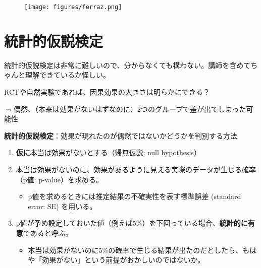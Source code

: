 \documentclass[
  xelatex,
  ja=standard]{bxjsarticle}
\providecommand{\tightlist}{%
  \setlength{\itemsep}{0pt}\setlength{\parskip}{0pt}}\usepackage{longtable,booktabs,array}
\begin{document}
\begin{figure}[htpb]

{\centering \texttt{[image: figures/ferraz.png]}

}

\caption{\citet{ferraz2008}}

\end{figure}

\hypertarget{ux7d71ux8a08ux7684ux4eeeux8aacux691cux5b9a}{%
\section{統計的仮説検定}\label{ux7d71ux8a08ux7684ux4eeeux8aacux691cux5b9a}}

\begin{tcolorbox}[enhanced jigsaw, left=2mm, coltitle=black, arc=.35mm, toprule=.15mm, colbacktitle=quarto-callout-warning-color!10!white, breakable, colframe=quarto-callout-warning-color-frame, opacityback=0, leftrule=.75mm, bottomrule=.15mm, colback=white, toptitle=1mm, opacitybacktitle=0.6, bottomtitle=1mm, rightrule=.15mm, titlerule=0mm, title=\textcolor{quarto-callout-warning-color}{\faExclamationTriangle}\hspace{0.5em}{警告}]

統計的仮説検定は非常に難しいので、分からなくても構わない。講師を含めてちゃんと理解できているか怪しい。

\end{tcolorbox}

RCTや自然実験であれば、因果効果の大きさは明らかにできる？

\(\leadsto\)偶然、（本来は効果がないはずなのに）2つのグループで差が出てしまった可能性

\textbf{統計的仮説検定}：効果が現れたのが偶然ではないかどうかを判別する方法

\begin{enumerate}
\def\labelenumi{\arabic{enumi}.}
\tightlist
\item
  \textbf{仮に}本当は効果がないとする（帰無仮説: null hypothesis）
\item
  本当は効果がないのに、効果があるように見える実際のデータが生じる確率（p値:
  p-value）を求める。

  \begin{itemize}
  \tightlist
  \item
    p値を求めるときには推定結果の不確実性を表す標準誤差 (standard error:
    SE) を用いる。
  \end{itemize}
\item
  p値が予め設定しておいた値（例えば\(5\%\)）を下回っている場合、\textbf{統計的に有意}であると呼ぶ。

  \begin{itemize}
  \tightlist
  \item
    本当は効果がないのに\(5\%\)の確率で生じる結果が出たのだとしたら、もはや「効果がない」という前提がおかしいのではないか。
  \end{itemize}
\end{enumerate}
\end{document}
